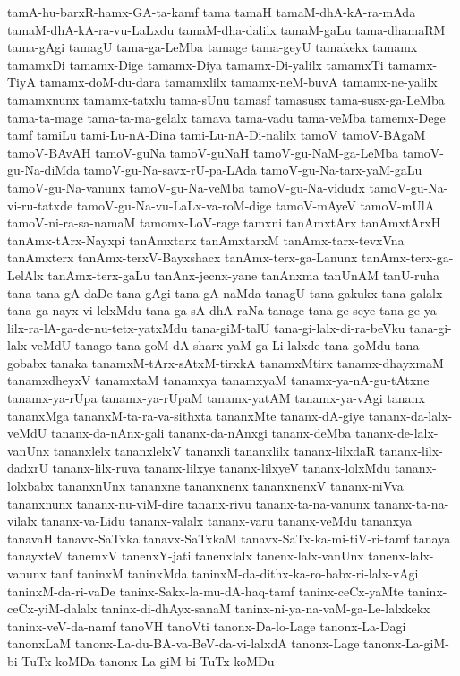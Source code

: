 {tamA-hu-barxR-hamx-GA-ta-kamf
tama
tamaH
tamaM-dhA-kA-ra-mAda
tamaM-dhA-kA-ra-vu-LaLxdu
tamaM-dha-dalilx
tamaM-gaLu
tama-dhamaRM
tama-gAgi
tamagU
tama-ga-LeMba
tamage
tama-geyU
tamakekx
tamamx
tamamxDi
tamamx-Dige
tamamx-Diya
tamamx-Di-yalilx
tamamxTi
tamamx-TiyA
tamamx-doM-du-dara
tamamxlilx
tamamx-neM-buvA
tamamx-ne-yalilx
tamamxnunx
tamamx-tatxlu
tama-sUnu
tamasf
tamasusx
tama-susx-ga-LeMba
tama-ta-mage
tama-ta-ma-gelalx
tamava
tama-vadu
tama-veMba
tamemx-Dege
tamf
tamiLu
tami-Lu-nA-Dina
tami-Lu-nA-Di-nalilx
tamoV
tamoV-BAgaM
tamoV-BAvAH
tamoV-guNa
tamoV-guNaH
tamoV-gu-NaM-ga-LeMba
tamoV-gu-Na-diMda
tamoV-gu-Na-savx-rU-pa-LAda
tamoV-gu-Na-tarx-yaM-gaLu
tamoV-gu-Na-vanunx
tamoV-gu-Na-veMba
tamoV-gu-Na-vidudx
tamoV-gu-Na-vi-ru-tatxde
tamoV-gu-Na-vu-LaLx-va-roM-dige
tamoV-mAyeV
tamoV-mUlA
tamoV-ni-ra-sa-namaM
tamomx-LoV-rage
tamxni
tanAmxtArx
tanAmxtArxH
tanAmx-tArx-Nayxpi
tanAmxtarx
tanAmxtarxM
tanAmx-tarx-tevxVna
tanAmxterx
tanAmx-terxV-Bayxshacx
tanAmx-terx-ga-Lanunx
tanAmx-terx-ga-LelAlx
tanAmx-terx-gaLu
tanAnx-jecnx-yane
tanAnxma
tanUnAM
tanU-ruha
tana
tana-gA-daDe
tana-gAgi
tana-gA-naMda
tanagU
tana-gakukx
tana-galalx
tana-ga-nayx-vi-lelxMdu
tana-ga-sA-dhA-raNa
tanage
tana-ge-seye
tana-ge-ya-lilx-ra-lA-ga-de-nu-tetx-yatxMdu
tana-giM-talU
tana-gi-lalx-di-ra-beVku
tana-gi-lalx-veMdU
tanago
tana-goM-dA-sharx-yaM-ga-Li-lalxde
tana-goMdu
tana-gobabx
tanaka
tanamxM-tArx-sAtxM-tirxkA
tanamxMtirx
tanamx-dhayxmaM
tanamxdheyxV
tanamxtaM
tanamxya
tanamxyaM
tanamx-ya-nA-gu-tAtxne
tanamx-ya-rUpa
tanamx-ya-rUpaM
tanamx-yatAM
tanamx-ya-vAgi
tananx
tananxMga
tananxM-ta-ra-va-sithxta
tananxMte
tananx-dA-giye
tananx-da-lalx-veMdU
tananx-da-nAnx-gali
tananx-da-nAnxgi
tananx-deMba
tananx-de-lalx-vanUnx
tananxlelx
tananxlelxV
tananxli
tananxlilx
tananx-lilxdaR
tananx-lilx-dadxrU
tananx-lilx-ruva
tananx-lilxye
tananx-lilxyeV
tananx-lolxMdu
tananx-lolxbabx
tananxnUnx
tananxne
tananxnenx
tananxnenxV
tananx-niVva
tananxnunx
tananx-nu-viM-dire
tananx-rivu
tananx-ta-na-vanunx
tananx-ta-na-vilalx
tananx-va-Lidu
tananx-valalx
tananx-varu
tananx-veMdu
tananxya
tanavaH
tanavx-SaTxka
tanavx-SaTxkaM
tanavx-SaTx-ka-mi-tiV-ri-tamf
tanaya
tanayxteV
tanemxV
tanenxY-jati
tanenxlalx
tanenx-lalx-vanUnx
tanenx-lalx-vanunx
tanf
taninxM
taninxMda
taninxM-da-dithx-ka-ro-babx-ri-lalx-vAgi
taninxM-da-ri-vaDe
taninx-Sakx-la-mu-dA-haq-tamf
taninx-ceCx-yaMte
taninx-ceCx-yiM-dalalx
taninx-di-dhAyx-sanaM
taninx-ni-ya-na-vaM-ga-Le-lalxkekx
taninx-veV-da-namf
tanoVH
tanoVti
tanonx-Da-lo-Lage
tanonx-La-Dagi
tanonxLaM
tanonx-La-du-BA-va-BeV-da-vi-lalxdA
tanonx-Lage
tanonx-La-giM-bi-TuTx-koMDa
tanonx-La-giM-bi-TuTx-koMDu
}
